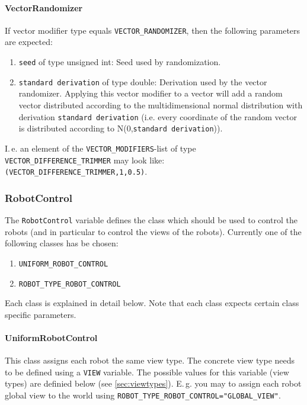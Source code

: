 \paragraph{VectorRandomizer} If vector modifier type equals \texttt{VECTOR\_RANDOMIZER}, then the following parameters are expected:
\begin{enumerate}
	\item \texttt{seed} of type unsigned int: Seed used by randomization.
	\item \texttt{standard derivation} of type double: Derivation used by the vector randomizer. Applying this vector modifier to a vector will add a random vector distributed according to the multidimensional normal distribution with derivation \texttt{standard derivation} (i.e. every coordinate of the random vector is distributed according to N(0,\texttt{standard derivation})).
\end{enumerate}
I.\,e. an element of the \texttt{VECTOR\_MODIFIERS}-list of type \texttt{VECTOR\_DIFFERENCE\_TRIMMER} may look like: \texttt{(VECTOR\_DIFFERENCE\_TRIMMER,1,0.5)}.

\subsubsection{RobotControl}\label{sec:robotControl}
The \texttt{RobotControl} variable defines the class which should be used to control the robots (and in particular to control the views of the robots). Currently one of the following classes has be chosen:
\begin{enumerate}
	\item \texttt{UNIFORM\_ROBOT\_CONTROL}
	\item \texttt{ROBOT\_TYPE\_ROBOT\_CONTROL}
\end{enumerate}
Each class is explained in detail below. Note that each class expects certain class specific parameters.

\paragraph{UniformRobotControl}\label{sec:uniformRobotControl} This class assigns each robot the same view type. The concrete view type needs to be defined using a \texttt{VIEW} variable. The possible values for this variable (view types) are definied below (see \ref{sec:viewtypes}). E.\,g. you may to assign each robot global view to the world using \texttt{ROBOT\_TYPE\_ROBOT\_CONTROL="GLOBAL\_VIEW"}.

